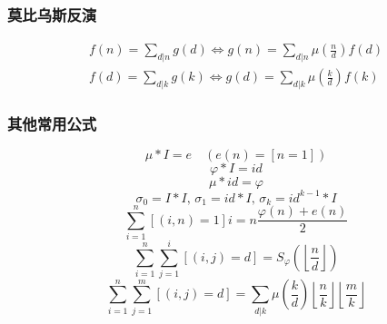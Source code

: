 \subsubsection{莫比乌斯反演}
	$$ \begin{aligned}
		f(n) = \sum_{d | n} g(d) \Leftrightarrow g(n) = \sum_{d | n} \mu\left( \frac n d \right) f(d) \\
		f(d) = \sum_{d | k} g(k) \Leftrightarrow g(d) = \sum_{d | k} \mu\left( \frac k d \right) f(k)
	\end{aligned} $$

\subsubsection{其他常用公式}
	$$\mu * I = e \quad (e(n) = [n = 1])$$
	$$\varphi * I = id $$
	$$\mu * id = \varphi $$
	$$\sigma_0 = I * I ,\, \sigma_1 = id * I ,\, \sigma_k = id^{k - 1} * I$$
	$$\sum_{i = 1} ^ n \left[(i, n) = 1\right] i = n \frac {\varphi(n) + e(n)} 2$$
	$$\sum_{i = 1} ^ n \sum_{j = 1} ^ i \left[(i, j) = d\right] = S_\varphi \left( \left\lfloor \frac n d \right\rfloor \right)$$
	$$\sum_{i = 1} ^ n \sum_{j = 1} ^ m \left[(i, j) = d\right] = \sum_{d | k} \mu\left( \frac k d \right) \left\lfloor \frac n k \right\rfloor \left\lfloor \frac m k \right\rfloor$$